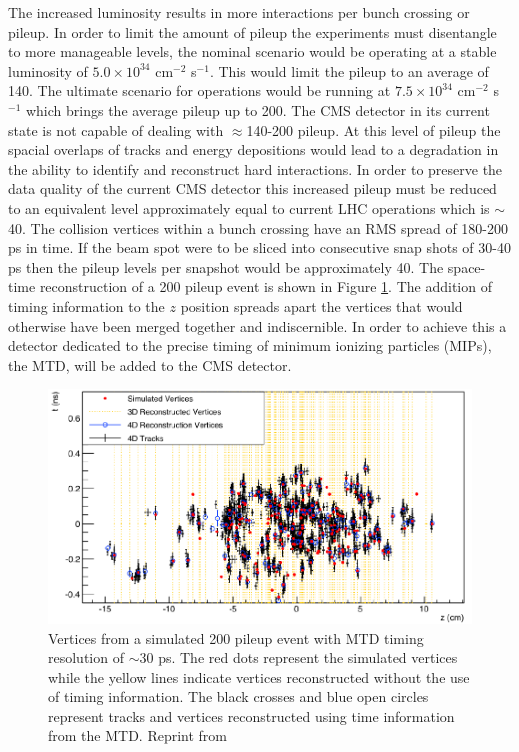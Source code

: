 The increased luminosity results in more interactions per bunch crossing or pileup.  In order to limit the amount of pileup the experiments must disentangle to more manageable levels, the nominal scenario would be operating at a stable luminosity of $5.0\times10^{34}$ cm$^{-2}$ s$^{-1}$.  This would limit the pileup to an average of 140.  The ultimate scenario for operations would be running at $7.5\times10^{34}$ cm$^{-2}$ s$^{-1}$ which brings the average pileup up to 200.  The CMS detector in its current state is not capable of dealing with $\approx$140-200 pileup.  At this level of pileup the spacial overlaps of tracks and energy depositions would lead to a degradation in the ability to identify and reconstruct hard interactions. In order to preserve the data quality of the current CMS detector this increased pileup must be reduced to an equivalent level approximately equal to current LHC operations which is $\sim$40.  The collision vertices within a bunch crossing have an RMS spread of 180-200 ps in time.  If the beam spot were to be sliced into consecutive snap shots of 30-40 ps then the pileup levels per snapshot would be approximately 40.  The space-time reconstruction of a 200 pileup event is shown in Figure \ref{fig:mtdpileup}.  The addition of timing information to the $z$ position spreads apart the vertices that would otherwise have been merged together and indiscernible.  In order to achieve this a detector dedicated to the precise timing of minimum ionizing particles (MIPs), the MTD, will be added to the CMS detector.  



\begin{figure}[h]
	\centering
	\includegraphics[width=1.0\linewidth]{Figures/MDT_pileup}
	\caption{Vertices from a simulated 200 pileup event with MTD timing resolution of $\sim$30 ps. The red dots represent the simulated vertices while the yellow lines indicate vertices reconstructed without the use of timing information. The black crosses and blue open circles represent tracks and vertices reconstructed using time information from the MTD. Reprint from}
	\label{fig:mtdpileup}
\end{figure}

